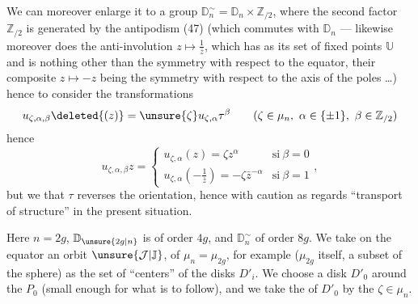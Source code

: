 
We can moreover enlarge it to a group
$\mathbb D_n^\sim=\mathbb D_n\times\mathbb Z_{/2}$,
where the second factor $\mathbb Z_{/2}$ is generated by the antipodism (47)
(which commutes with $\mathbb D_n$ --- likewise moreover
does the anti-involution $z\longmapsto\frac{1}{\bar z}$, which has as its
set of fixed points $\mathbb U$ and is nothing other than the symmetry with respect to
the equator, their composite $z\longmapsto-z$ being the symmetry with respect to
the axis of the poles \ldots) hence to consider the transformations
\[
u_{\zeta,\alpha,\beta}\deleted{(z)}=\unsure{\zeta}u_{\zeta,\alpha}\tau^\beta
\qquad
(\zeta\in\mu_n,\ \alpha\in\{\pm1\},\ \beta\in\mathbb Z_{/2})
\]
hence
\[
u_{\zeta,\alpha,\beta}z=
\begin{cases}
u_{\zeta,\alpha}(z)=\zeta z^\alpha&\mathrm{si}\ \beta=0\\
u_{\zeta,\alpha}(-\frac{1}{\bar z})=-\zeta\bar z^{-\alpha}
&\mathrm{si}\ \beta=1
\end{cases},
\]
but we  that $\tau$ reverses the orientation,
hence 
 with
caution as regards ``transport of structure'' in
the present situation.

Here $n=2g$, $\mathbb D_{\unsure{2g|n}}$ is of order $4g$, and
$\mathbb D_n^\sim$ of order $8g$. We take on the equator an
orbit $\unsure{\mathcal J|\mathbb J}$, of $\mu_n=\mu_{2g}$, for example
 
 ($\mu_{2g}$
itself, 
 a subset of the sphere) as the set of ``centers''
of the disks $D'_i$. We choose a disk $D'_0$ around the
 $P_0$ (small enough for what is to follow), and we
take the  of $D'_0$ by the
$\zeta\in\mu_n$.




